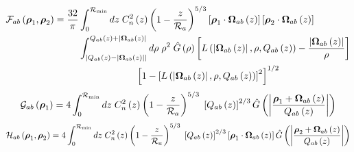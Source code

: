 \begin{equation}\label{caliph_F}
\begin{split}
\mathcal{F}_{ab}\left(\boldsymbol{\rho}_{1}, \boldsymbol{\rho}_{2}\right) = 
\frac{32}{\pi}& \int_{0}^{\mathcal{R}_{\rm min}} dz \; C_{n}^{2}\left(z\right) \left( 1 - \frac{z}{\mathcal{R}_{a}}\right)^{5/3}
\left[\boldsymbol{\rho}_{1} \cdot \boldsymbol{\Omega}_{ab}\left(z\right) \right]
\left[\boldsymbol{\rho}_{2} \cdot \boldsymbol{\Omega}_{ab}\left(z\right) \right] \\
&
\int^{Q_{ab}\left(z\right)+\left\vert \boldsymbol{\Omega}_{ab}\left(z\right)\right\vert}_{\left\vert Q_{ab}\left(z\right)-\left\vert \boldsymbol{\Omega}_{ab}\left(z\right)\right\vert\right\vert}
d\rho \; \rho^{2} \; \hat{G}\left(\rho\right) 
\left[L\left(\left\vert\boldsymbol{\Omega}_{ab}\left(z\right)\right\vert, \rho, Q_{ab}\left(z\right)\right) - \frac{\left\vert \boldsymbol{\Omega}_{ab}\left(z\right) \right\vert}{\rho}\right]\\
& 
\quad\quad\quad\quad\quad\quad
\left[1 - \left[L\left(\left\vert\boldsymbol{\Omega}_{ab}\left(z\right)\right\vert, \rho, Q_{ab}\left(z\right)\right)\right]^{2}\right]^{1/2}
\end{split}
\end{equation}
\begin{equation}\label{caliph_G}
\mathcal{G}_{ab}\left(\boldsymbol{\rho}_{1}\right) = 
4 \int_{0}^{\mathcal{R}_{\rm min}} dz \; C_{n}^{2}\left(z\right) \left( 1 - \frac{z}{\mathcal{R}_{a}}\right)^{5/3}\; 
\left[Q_{ab}\left(z\right)\right]^{2/3} 
\hat{G}\left(\left\vert \frac{\boldsymbol{\rho}_{1} + \boldsymbol{\Omega}_{ab}\left(z\right)}{Q_{ab}\left(z\right)}\right\vert\right)
\end{equation}
\begin{equation}\label{caliph_H}
\mathcal{H}_{ab}\left(\boldsymbol{\rho}_{1}, \boldsymbol{\rho}_{2}\right) = 
4 \int_{0}^{\mathcal{R}_{\rm min}} dz \; C_{n}^{2}\left(z\right) \left( 1 - \frac{z}{\mathcal{R}_{a}}\right)^{5/3}\; 
\left[Q_{ab}\left(z\right)\right]^{2/3} \left[\boldsymbol{\rho}_{1}\cdot\boldsymbol{\Omega}_{ab}\left(z\right)\right]
\hat{G}\left(\left\vert \frac{\boldsymbol{\rho}_{2} + \boldsymbol{\Omega}_{ab}\left(z\right)}{Q_{ab}\left(z\right)}\right\vert\right)
\end{equation}
